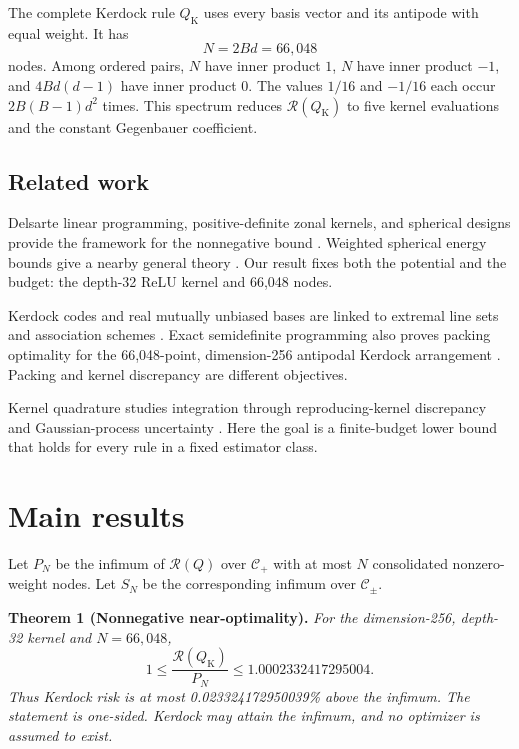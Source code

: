 \documentclass[11pt]{article}
\begin{document}
The complete Kerdock rule \(Q_{\mathrm K}\) uses every basis vector and
its antipode with equal weight. It has
\[
N=2Bd=66{,}048
\]
nodes. Among ordered pairs, \(N\) have inner product \(1\), \(N\) have
inner product \(-1\), and \(4Bd(d-1)\) have inner product \(0\). The
values \(1/16\) and \(-1/16\) each occur \(2B(B-1)d^2\) times. This
spectrum reduces \(\mathcal{R}(Q_{\mathrm K})\) to five kernel evaluations
and the constant Gegenbauer coefficient.

\subsection{Related work}\label{related-work}

Delsarte linear programming, positive-definite zonal kernels, and spherical
designs provide the framework for the nonnegative bound
\citep{schoenberg1942,delsarte1977,cohn2007}. Weighted spherical energy
bounds give a nearby general theory \citep{borodachov2024weighted}. Our
result fixes both the potential and the budget: the depth-32 ReLU kernel
and 66,048 nodes.

Kerdock codes and real mutually unbiased bases are linked to extremal line
sets and association schemes
\citep{calderbank1997,boykin2005,abdukhalikov2009}. Exact semidefinite
programming also proves packing optimality for the 66,048-point,
dimension-256 antipodal Kerdock arrangement \citep{cohn2024sdp}. Packing
and kernel discrepancy are different objectives.

Kernel quadrature studies integration through reproducing-kernel
discrepancy and Gaussian-process uncertainty
\citep{briol2019}. Here the goal is a finite-budget lower
bound that holds for every rule in a fixed estimator class.

\section{Main results}\label{main-results}

Let \(P_N\) be the infimum of \(\mathcal{R}(Q)\) over
\(\mathcal{C}_{+}\) with at most \(N\) consolidated nonzero-weight nodes.
Let \(S_N\) be the corresponding infimum over \(\mathcal{C}_{\pm}\).

\textbf{Theorem 1 (Nonnegative near-optimality).}
\emph{For the dimension-256, depth-32 kernel and \(N=66{,}048\),}
\[
1\leq
\frac{\mathcal{R}(Q_{\mathrm K})}{P_N}
\leq 1.0002332417295004.
\]
\emph{Thus Kerdock risk is at most 0.023324172950039\% above the
infimum. The statement is one-sided. Kerdock may attain the infimum, and
no optimizer is assumed to exist.}
\end{document}

